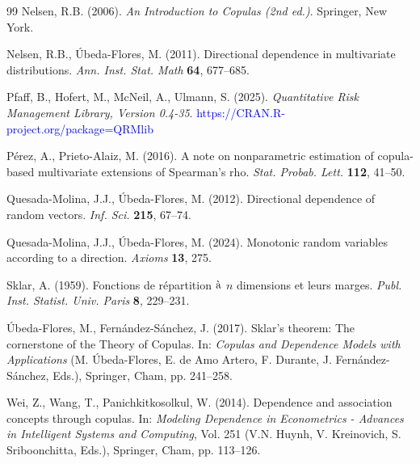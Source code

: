 \documentclass[11pt,a4paper]{article}
\begin{document}
\begin{thebibliography}{99}
 Nelsen, R.B. (2006). {\it An Introduction to Copulas (2nd ed.)}. Springer, New York.

 Nelsen, R.B., Úbeda-Flores, M. (2011). Directional dependence in multivariate distributions. {\it Ann. Inst. Stat. Math} {\bf 64}, 677--685. 

 Pfaff, B., Hofert, M., McNeil, A., Ulmann, S. (2025). {\it Quantitative Risk Management Library, Version 0.4-35}. \textcolor{blue}{https://CRAN.R-project.org/package=QRMlib}

 Pérez, A., Prieto-Alaiz, M. (2016). A note on nonparametric estimation of copula-based multivariate extensions of Spearman's rho. {\em Stat. Probab. Lett.} {\bf 112}, 41--50.

 Quesada-Molina, J.J., Úbeda-Flores, M. (2012). Directional dependence of random vectors. {\it Inf. Sci.} {\bf 215}, 67--74.

 Quesada-Molina, J.J., Úbeda-Flores, M. (2024). Monotonic random variables according to a direction. {\em Axioms} {\bf 13}, 275.

 Sklar, A. (1959). Fonctions de r\'epartition $\grave{\rm a}$ $n$ dimensions et leurs marges. {\it Publ. Inst. Statist. Univ. Paris} {\bf 8}, 229--231.

 \'Ubeda-Flores, M., Fern\'andez-S\'anchez, J. (2017). Sklar's theorem: The cornerstone of the Theory of Copulas. In: {\it Copulas and Dependence Models with Applications} (M. \'Ubeda-Flores, E. de Amo Artero, F. Durante, J. Fern\'andez-S\'anchez, Eds.), Springer, Cham, pp. 241--258.

 Wei, Z., Wang, T., Panichkitkosolkul, W. (2014). Dependence and association concepts through copulas. In: {\it Modeling Dependence in Econometrics - Advances in Intelligent Systems and Computing}, Vol. 251 (V.N. Huynh, V. Kreinovich, S. Sriboonchitta, Eds.), Springer, Cham, pp. 113--126.
\end{thebibliography}
\end{document}
